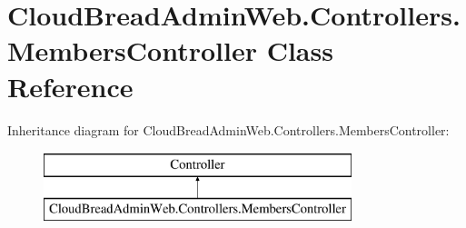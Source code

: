 \hypertarget{class_cloud_bread_admin_web_1_1_controllers_1_1_members_controller}{}\section{Cloud\+Bread\+Admin\+Web.\+Controllers.\+Members\+Controller Class Reference}
\label{class_cloud_bread_admin_web_1_1_controllers_1_1_members_controller}
Inheritance diagram for Cloud\+Bread\+Admin\+Web.\+Controllers.\+Members\+Controller\+:\begin{figure}[H]
\begin{center}
\leavevmode
\includegraphics[height=2.000000cm]{class_cloud_bread_admin_web_1_1_controllers_1_1_members_controller}
\end{center}
\end{figure}
